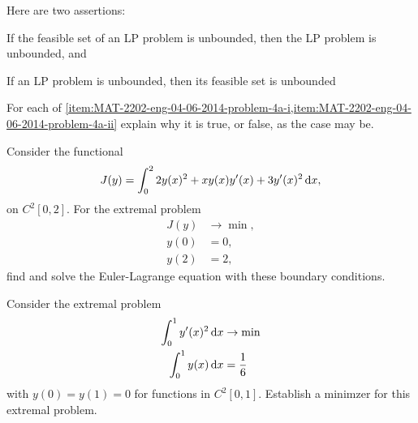 \begin{subproblem}
    Here are two assertions:
    \begin{romanrate*}
        \item \label{item:MAT-2202-eng-04-06-2014-problem-4a-i} If the feasible set of an LP problem is unbounded, then the LP problem is unbounded, and 
        \item 
        \label{item:MAT-2202-eng-04-06-2014-problem-4a-ii} If an LP problem is unbounded, then its feasible set is unbounded
    \end{romanrate*}
    For each of \cref{item:MAT-2202-eng-04-06-2014-problem-4a-i,item:MAT-2202-eng-04-06-2014-problem-4a-ii} explain why it is true, or false, as the case may be.
\end{subproblem}


\Problem

\begin{subproblem}
    Consider the functional
    \begin{equation}
        J(y) 
        = \int_0^2 2y(x)^2 + xy(x)y'(x) + 3y'(x)^2 \dx,
    \end{equation}
    on $C^2[0,2]$. For the extremal problem
    \begin{align}
        J(y) & \to \min, \\
        y(0) & = 0, \\
        y(2) & = 2,
    \end{align}
    find and solve the Euler-Lagrange equation with these boundary conditions.
\end{subproblem}

\begin{subproblem}
    Consider the extremal problem
    \begin{align}
        \int_0^1 y'(x)^2 \dx 
        & \to \min \\
        \int_0^1 y(x) \dx & = \frac{1}{6}
    \end{align}
    with $y(0) = y(1) = 0$ for functions in $C^2[0,1]$. Establish a minimzer for this extremal problem.
\end{subproblem}


\Problem

